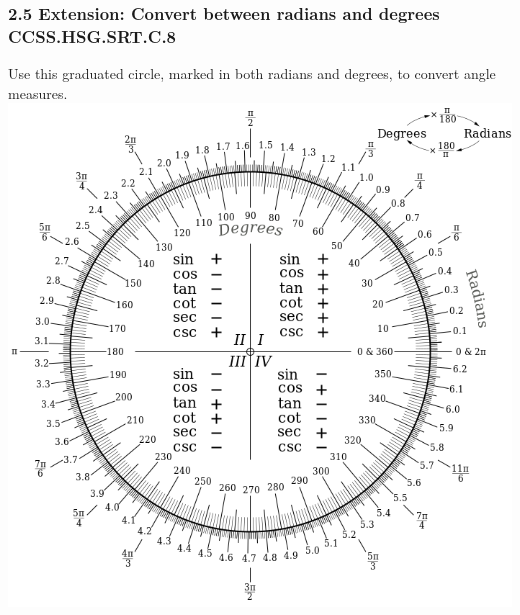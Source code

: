 

\fancyhead[LE]{\thepage}



\subsubsection*{2.5 Extension: Convert between radians and degrees \hfill CCSS.HSG.SRT.C.8}

Use this graduated circle, marked in both radians and degrees, to convert angle measures.\\
\includegraphics[width=16cm]{../graphics/Degree-Radian_Conversion.png}
